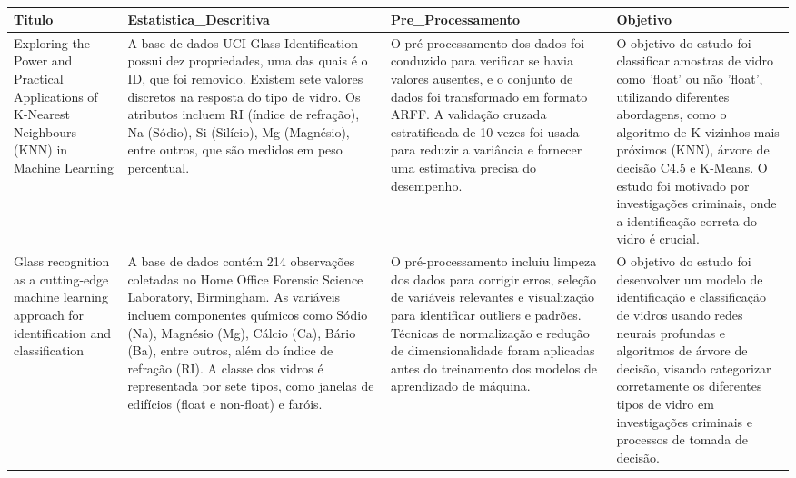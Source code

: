 \documentclass[
]{article}
\begin{document}
\begin{table}
\centering
\caption{\label{tab:unnamed-chunk-14}}
\centering
\fontsize{10}{12}\selectfont
\begin{tabu} to 
\hline
Titulo & Estatistica\_Descritiva & Pre\_Processamento & Objetivo\\
\hline
Exploring the Power and Practical Applications of K-Nearest Neighbours (KNN) in Machine Learning & A base de dados UCI Glass Identification possui dez propriedades, uma das quais é o ID, que foi removido. Existem sete valores discretos na resposta do tipo de vidro. Os atributos incluem RI (índice de refração), Na (Sódio), Si (Silício), Mg (Magnésio), entre outros, que são medidos em peso percentual. & O pré-processamento dos dados foi conduzido para verificar se havia valores ausentes, e o conjunto de dados foi transformado em formato ARFF. A validação cruzada estratificada de 10 vezes foi usada para reduzir a variância e fornecer uma estimativa precisa do desempenho. & O objetivo do estudo foi classificar amostras de vidro como 'float' ou não 'float', utilizando diferentes abordagens, como o algoritmo de K-vizinhos mais próximos (KNN), árvore de decisão C4.5 e K-Means. O estudo foi motivado por investigações criminais, onde a identificação correta do vidro é crucial.\\
\hline
Glass recognition as a cutting-edge machine learning approach for identification and classification & A base de dados contém 214 observações coletadas no Home Office Forensic Science Laboratory, Birmingham. As variáveis incluem componentes químicos como Sódio (Na), Magnésio (Mg), Cálcio (Ca), Bário (Ba), entre outros, além do índice de refração (RI). A classe dos vidros é representada por sete tipos, como janelas de edifícios (float e non-float) e faróis. & O pré-processamento incluiu limpeza dos dados para corrigir erros, seleção de variáveis relevantes e visualização para identificar outliers e padrões. Técnicas de normalização e redução de dimensionalidade foram aplicadas antes do treinamento dos modelos de aprendizado de máquina. & O objetivo do estudo foi desenvolver um modelo de identificação e classificação de vidros usando redes neurais profundas e algoritmos de árvore de decisão, visando categorizar corretamente os diferentes tipos de vidro em investigações criminais e processos de tomada de decisão.\\
\hline
\end{tabu}
\end{table}
\end{document}
